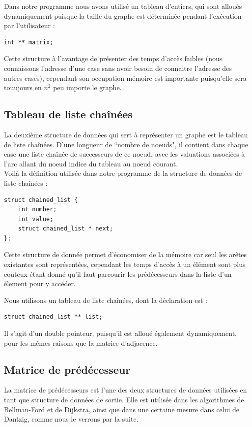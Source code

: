 \documentclass[a4paper,12pt,final] {article}
\begin{document}
Dans notre programme nous avons utilisé un tableau d'entiers, qui sont alloués dynamiquement puisque la taille du graphe est déterminée pendant l'exécution par l'utilisateur :
\begin{lstlisting}
int ** matrix;
\end{lstlisting}

Cette structure à l'avantage de présenter des temps d'accès faibles (nous connaissons l'adresse d'une case sans avoir besoin de connaitre l'adresse des autres cases), cependant son occupation mémoire est importante puisqu'elle sera touujours en $n^{2}$ peu importe le graphe.
\subsection{Tableau de liste chaînées}

La deuxième structure de données qui sert à représenter un graphe est le tableau de liste chaînées. D'une longueur de ``nombre de noeuds", il contient dans chaque case une liste chaînée de successeurs de ce noeud, avec les valuations associées à l'arc allant du noeud indice du tableau au noeud courant.\\

Voilà la définition utilisée dans notre programme de la structure de données de liste chaînées :
\begin{lstlisting}
struct chained_list {
	int number;
	int value;
	struct chained_list * next;
};
\end{lstlisting}

Cette structure de donnée permet d'économiser de la mémoire car seul les arêtes existantes sont représentées, cependant les temps d'accès à un élément sont plus couteux étant donné qu'il faut parcourir les prédécesseurs dans la liste d'un élement pour y accéder.

Nous utilisons un tableau de liste chaînées, dont la déclaration est :
\begin{lstlisting}
struct chained_list ** list;
\end{lstlisting}
Il s'agit d'un double pointeur, puisqu'il est alloué également dynamiquement, pour les mêmes raisons que la matrice d'adjacence.

\subsection{Matrice de prédécesseur}

La matrice de prédécesseurs est l'une des deux structures de données utilisées en tant que structure de données de sortie. Elle est utilisée dans les algorithmes de Bellman-Ford et de Dijkstra, ainsi que dans une certaine mesure dans celui de Dantzig, comme nous le verrons par la suite.\\
\end{document}
